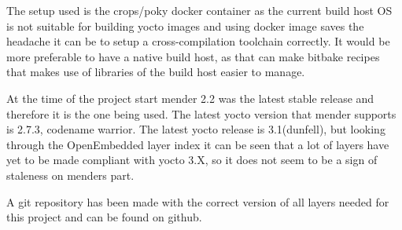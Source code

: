 \documentclass[../../main.tex]{subfiles}
\begin{document}
The setup used is the crops/poky docker container\cite{crops-poky} as the current build host OS is
not suitable for building yocto images and using docker image saves the headache it can be to
setup a cross-compilation toolchain correctly.
It would be more preferable to have a native build host, as that can make bitbake recipes
that makes use of libraries of the build host easier to manage.

At the time of the project start mender 2.2 was the latest stable release and therefore it
is the one being used.
The latest yocto version that mender supports is 2.7.3, codename warrior.
The latest yocto release is 3.1(dunfell), but looking through the
OpenEmbedded layer index\cite{oe-index}
it can be seen that a lot of layers have yet to be made compliant with yocto 3.X, so it does not
seem to be a sign of staleness on menders part.

A git repository has been made with the correct version of all layers needed for this project and
can be found on github\cite{yocto-build}.
\end{document}
